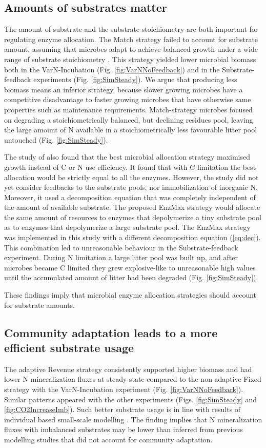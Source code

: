 \subsection{Amounts of substrates matter}
The amount of substrate and the substrate stoichiometry are both important for
regulating enzyme allocation. The Match strategy failed to account for substrate
amount, assuming that microbes adapt to achieve balanced growth under a wide
range of substrate stoichiometry \citep{Moorhead12, Ballantyne14}. This strategy yielded
lower microbial biomass both in the VarN-Incubation (Fig.
\ref{fig:VarNNoFeedback}) and in the Substrate-feedback experiments (Fig.
\ref{fig:SimSteady}). We argue that producing less biomass means an inferior
strategy, because slower growing microbes have a competitive disadvantage to
faster growing microbes that have otherwise same properties such as
maintenance requirements. Match-strategy microbes focused on degrading a
stoichiometrically balanced, but declining residues pool, leaving the large
amount of N available in a stoichiometrically less favourable litter pool
untouched (Fig. \ref{fig:SimSteady}).

The study of \citet{Averill14} also found that the best microbial allocation
strategy maximised growth instead of C or N use efficiency. It found that with C
limitation the best allocation would be strictly equal to all the enzymes.
However, the study did not yet consider feedbacks to the substrate pools, nor
immobilization of inorganic N. Moreover, it used a decomposition equation that
was completely independent of the amount of available substrate. The proposed
EnzMax strategy would allocate the same amount of resources to enzymes that
depolymerize a tiny substrate pool as to enzymes that depolymerize a large
substrate pool.
The EnzMax strategy was implemented in this study with a different decomposition
equation (\ref{eq:dec}). This combination led to unreasonable behaviour in the
Substrate-feedback experiment. During N limitation a large litter pool was built
up, and after microbes became C limited they grew explosive-like to unreasonable
high values until the accumulated amount of litter had been degraded (Fig.
\ref{fig:SimSteady}).

These findings imply that microbial enzyme allocation strategies should
account for substrate amounts.

\subsection{Community adaptation leads to a more efficient substrate usage}
The adaptive Revenue strategy consistently supported higher biomass and had
lower N mineralization fluxes at steady state compared to the non-adaptive
Fixed strategy with the VarN-Incubation experiment (Fig.
\ref{fig:VarNNoFeedback}). Similar patterns appeared with the other experiments
(Figs. \ref{fig:SimSteady} and \ref{fig:CO2IncreaseImb}). Such better substrate
usage is in line with results of individual based small-scale modelling
\citep{Kaiser14}.
The finding implies that N mineralization fluxes with imbalanced substrates may
be lower than inferred from previous modelling studies that did not account for
community adaptation.

